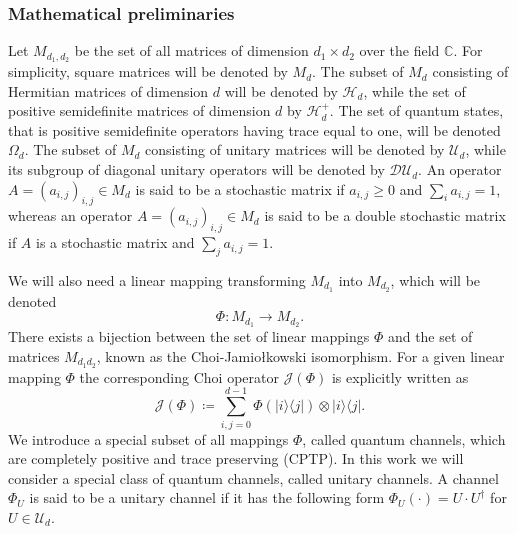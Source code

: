 \documentclass[preprint,12pt, a4paper]{elsarticle}
\newcommand{\ket}[1]{\ensuremath{|#1\rangle}}
\newcommand{\bra}[1]{\ensuremath{\langle#1|}}
\newcommand{\ketbra}[2]{\ensuremath{\ket{#1}\bra{#2}}}
\newcommand{\1}{{\rm 1\hspace{-0.9mm}l}}
\newcommand{\DD}{\mathcal{D}}
\newcommand{\UU}{\mathcal{U}}
\newcommand{\HH}{\mathcal{H}}
\begin{document}
\subsubsection{Mathematical preliminaries}



Let $M_{d_1,d_2}$ be the set of all matrices of dimension $d_1 \times d_2$ over
the field $\mathbb{C}$. For  simplicity, square matrices will be denoted by
$M_d$.  The subset of $M_d$ consisting of Hermitian matrices of dimension $d$
will  be  denoted  by $\HH_d$,  while  the  set  of  positive semidefinite
matrices of dimension $d$ by $\HH_d^+$. The set of quantum states, that is
positive semidefinite operators having trace equal to one, will be denoted
$\Omega_d$. 
 The subset of $M_d$ consisting of unitary matrices will be denoted
by $\UU_d$, while its subgroup of diagonal unitary operators will be denoted by
$\DD \UU_d$. 
	An operator $A = \left( a_{i,j}\right)_{i,j} \in M_d$ is said to be a stochastic matrix if $a_{i,j} \ge 0$   and $\sum_{i} a_{i,j} = 1$, whereas an operator $A = \left( a_{i,j}\right)_{i,j} \in M_d$ is said to be a double stochastic matrix if $A$ is a stochastic matrix and $\sum_{j} a_{i,j} = 1$.


 We will also need a linear mapping transforming $M_{d_1}$ into
$M_{d_2}$, which will be denoted 
\begin{equation}
\Phi: M_{d_1 } \rightarrow M_{d_2}.
\end{equation} 
There
exists a bijection between the set of linear mappings $\Phi$ and the set of matrices $M_{d_1d_2}$,  known as the Choi-Jamio{\l}kowski isomorphism. 
For a given linear mapping $\Phi$ the corresponding Choi operator $\mathcal{J}(\Phi)$ is explicitly written as 
\begin{equation}
\mathcal{J}(\Phi) \coloneqq \sum_{i,j=0}^{d- 1} \Phi(\ketbra{i}{j}) \otimes \ketbra{i}{j}. \end{equation}
We introduce a special subset of all mappings $\Phi$, called quantum channels, which are completely positive
and trace preserving (CPTP).
In this work we will consider a special class of quantum channels, called unitary channels.  A 
channel
$\Phi_{U}$ is said to be a unitary channel if it has the following form $\Phi_U(\cdot) = U \cdot U^\dagger$ for  $U \in 
\UU_d$.
\end{document}
